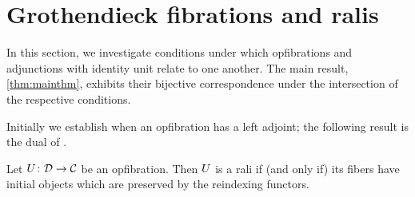 \documentclass{amsart}
\begin{document}
\section{Grothendieck fibrations and ralis}
\label{sec:groth-fibs-ralis}

In this section, we investigate conditions under which opfibrations and adjunctions with identity unit relate to one another. The main result, \cref{thm:mainthm}, exhibits their bijective correspondence under the intersection of the respective conditions.

Initially we establish when an opfibration has a left adjoint; the following result is the dual of \cite[Prop. 4.4]{Grayfibredandcofibred}.

\begin{prop}\label{prop:opfibtolari}
 Let $U\colon\mathcal{D}\to\mathcal{C}$ be an opfibration. Then $U$ is a rali if (and only if) its fibers have initial objects which are preserved by the reindexing functors. 
\end{prop}
\end{document}
